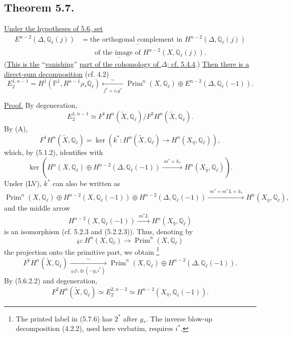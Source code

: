 \subsection*{Theorem 5.7.}
\underline{Under the hypotheses of 5.6, set}
\[
\begin{aligned}
E^{n-2}(\Delta,\mathbb Q_\ell(j))
&=\underline{\text{the orthogonal complement in }}
H^{n-2}(\Delta,\mathbb Q_\ell(j))\\
&\qquad\underline{\text{of the image of }}
H^{n-2}(X,\mathbb Q_\ell(j)).
\end{aligned}
\]
(\underline{This is the} \textquotedblleft\underline{vanishing}\textquotedblright{}
\underline{part of the cohomology of $\Delta$; cf. 5.4.4}.)  \underline{Then there is a
direct-sum decomposition} (cf. 4.2)
\begin{equation}\tag{5.7.1}
E_2^{1,n-1}
=H^1(\mathbb P^1,R^{n-1}\rho_*\mathbb Q_\ell)
\xleftarrow[\;f^*+i_*g^*\;]{\sim}
\operatorname{Prim}^n(X,\mathbb Q_\ell)
\oplus E^{n-2}(\Delta,\mathbb Q_\ell(-1)).
\end{equation}

\underline{Proof.}
By degeneration,
\[
E_2^{1,n-1}\simeq
F^1H^n(\widetilde X,\mathbb Q_\ell)
\big/F^2H^n(\widetilde X,\mathbb Q_\ell).
\]
By (A),
\begin{equation}\tag{5.7.2}
F^1H^n(\widetilde X,\mathbb Q_\ell)
=\ker\!\left(
k^*:H^n(\widetilde X,\mathbb Q_\ell)\longrightarrow
H^n(X_{\bar\eta},\mathbb Q_\ell)
\right),
\end{equation}
which, by (5.1.2), identifies with
\[
\ker\!\left(
H^n(X,\mathbb Q_\ell)
\oplus H^{n-2}(\Delta,\mathbb Q_\ell(-1))
\xrightarrow{\;m^*+h_*\;}
H^n(X_{\bar\eta},\mathbb Q_\ell)
\right).
\]
Under (LV), $k^*$ can also be written as
\begin{equation}\tag{5.7.3}
\operatorname{Prim}^n(X,\mathbb Q_\ell)
\oplus H^{n-2}(X,\mathbb Q_\ell(-1))
\oplus H^{n-2}(\Delta,\mathbb Q_\ell(-1))
\xrightarrow{\;m^*+m^*L+h_*\;}
H^n(X_{\bar\eta},\mathbb Q_\ell),
\end{equation}
and the middle arrow
\begin{equation}\tag{5.7.4}
H^{n-2}(X,\mathbb Q_\ell(-1))
\xrightarrow{\;m^*L\;}
H^n(X_{\bar\eta},\mathbb Q_\ell)
\end{equation}
is an isomorphism (cf. 5.2.3 and (5.2.2.3)).  Thus, denoting by
\begin{equation}\tag{5.7.5}
\wp:H^n(X,\mathbb Q_\ell)\longrightarrow
\operatorname{Prim}^n(X,\mathbb Q_\ell)
\end{equation}
the projection onto the primitive part, we obtain
\footnote{The printed label in (5.7.6) has $2^*$ after $g_*$.
The inverse blow-up decomposition (4.2.2), used here verbatim, requires
$i^*$.}
\begin{equation}\tag{5.7.6}
F^1H^n(\widetilde X,\mathbb Q_\ell)
\xrightarrow[\;\wp f_*\oplus(-g_*i^*)\;]{\sim}
\operatorname{Prim}^n(X,\mathbb Q_\ell)
\oplus H^{n-2}(\Delta,\mathbb Q_\ell(-1)).
\end{equation}
By (5.6.2.2) and degeneration,
\begin{equation}\tag{5.7.7}
F^2H^n(\widetilde X,\mathbb Q_\ell)
\simeq E_2^{2,n-2}
\simeq H^{n-2}(X_{\bar\eta},\mathbb Q_\ell(-1)).
\end{equation}

